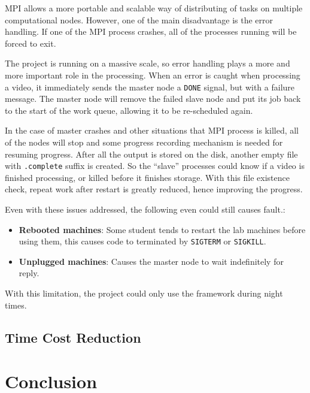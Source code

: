 \documentclass[bsc,logo,twoside,fullspacing,parskip]{infthesis}
\begin{document}
MPI allows a more portable and scalable way of distributing of tasks on multiple computational nodes.
However, one of the main disadvantage is the error handling. 
If one of the MPI process crashes, all of the processes running will be forced to exit.

The project is running on a massive scale, so error handling plays a more and more important role in the processing. 
When an error is caught when processing a video, it immediately sends the master node a {\tt DONE} signal, but with a failure message. The master node will remove the failed slave node and put its job back to the start of the work queue, allowing it to be re-scheduled again.

In the case of master crashes and other situations that MPI process is killed, all of the nodes will stop and some progress recording mechanism is needed for resuming progress. After all the output is stored on the disk, another empty file with {\tt .complete} suffix is created. So the ``slave'' processes could know if a video is finished processing, or killed before it finishes storage. With this file existence check, repeat work after restart is greatly reduced, hence improving the progress.

Even with these issues addressed, the following even could still causes fault.:
\begin{itemize}
\setlength{\parskip}{0pt}
\item \textbf{Rebooted machines}: Some student tends to restart the lab machines before using them, this causes code to terminated by {\tt SIGTERM} or {\tt SIGKILL}.
\item \textbf{Unplugged machines}: Causes the master node to wait indefinitely for reply.
\end{itemize}
With this limitation, the project could only use the framework during night times.

\section{Time Cost Reduction} 


\newpage

\chapter{Conclusion}
\label{chap:conclusion}
\end{document}
